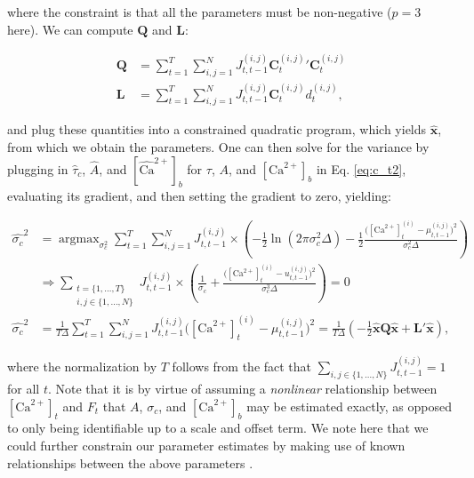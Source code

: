 \documentclass[10pt]{article}
\providecommand{\ve}[1]{\boldsymbol{#1}}
\providecommand{\ve}[1]{\boldsymbol{#1}}
\DeclareMathOperator*{\argmax}{argmax}
\newcommand{\Ca}{[\text{Ca}^{2+}]}
\newcommand{\wCab}{[\widehat{\text{Ca}}^{2+}]_b}
\begin{document}
\noindent where the constraint is that all the parameters must be non-negative ($p=3$ here). We can compute $\ve{Q}$ and $\ve{L}$:

\begin{align}
\ve{Q} &= \sum_{t=1}^T \sum_{i,j=1}^N J^{(i,j)}_{t,t-1}  {\ve{C}^{(i,j)}_t}' \ve{C}^{(i,j)}_t\\
\ve{L} &= \sum_{t=1}^T \sum_{i,j=1}^N J^{(i,j)}_{t,t-1} \ve{C}^{(i,j)}_t d^{(i,j)}_t,
\end{align}

\noindent and plug these quantities into a constrained quadratic program, which yields $\widehat{\ve{x}}$, from which we obtain the parameters.  One can then solve for the variance by plugging in $\widehat{\tau}_c$, $\widehat{A}$, and $\wCab$  for $\tau$, $A$,  and $\Ca_b$ in Eq. \ref{eq:c_t2}, evaluating its gradient, and then setting the gradient to zero, yielding:

\begin{subequations}
\begin{align}
\widehat{\sigma_c}^2 &= \argmax_{\sigma_c^2} \sum_{t=1}^T \sum_{i,j=1}^N J^{(i,j)}_{t,t-1} \times \left( -\frac{1}{2} \ln (2 \pi \sigma_c^2 \Delta) - \frac{1}{2} \frac{\big(\Ca_t^{(i)} - \mu_{t,t-1}^{(i,j)}\big)^2}{\sigma_c^2 \Delta}\right)
\\ &\Rightarrow \sum_{\substack{t=\{1,\ldots,T\} \\ i,j \in \{1,\ldots,N\}}} J^{(i,j)}_{t,t-1} \times \left( \frac{1}{\sigma_c} + \frac{\big(\Ca_t^{(i)} -u_{t,t-1}^{(i,j)}\big)^2}{\sigma_c^3 \Delta}\right) = 0
\\ \widehat{\sigma_c}^2 &= \frac{1}{T \Delta}\sum_{t=1}^T \sum_{i,j=1}^N J^{(i,j)}_{t,t-1} \big(\Ca_t^{(i)}- \mu_{t,t-1}^{(i,j)}\big)^2= \frac{1}{T \Delta} \left(-\frac{1}{2}\widehat{\ve{x}} \ve{Q} \widehat{\ve{x}} + \ve{L}' \widehat{\ve{x}}\right), \label{eq:sig}
\end{align}
\end{subequations}

\noindent where the normalization by $T$ follows from the fact that $\sum_{i,j \in \{1,\ldots,N\}} J^{(i,j)}_{t,t-1}=1$ for all  $t$. Note that it is by virtue of assuming a \emph{nonlinear} relationship between $\Ca_t$ and $F_t$ that $A$, $\sigma_c$, and $\Ca_b$ may be estimated exactly, as opposed to only being identifiable up to a scale and offset term. We note here that we could further constrain our parameter estimates by making use of known relationships between the above parameters \cite{ImagingManual}. 
\end{document}
